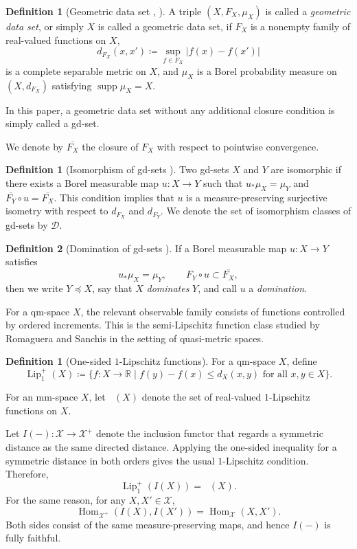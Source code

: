 \documentclass{amsart}
\theoremstyle{plain}
\theoremstyle{definition}
\newtheorem{definition}[theorem]{Definition}
\newtheorem*{definition*}{Definition}
\theoremstyle{remark}
\newcommand{\R}{\mathbb{R}}
\newcommand{\D}{\mathcal{D}}
\newcommand{\X}{\mathcal{X}}
\newcommand{\Xp}{\mathcal{X}^{+}}
\newcommand{\lipplus}{\operatorname{Lip}^{+}_{1}}
\DeclareMathOperator{\lipone}{Lip_1}
\DeclareMathOperator{\supp}{supp}
\begin{document}
\begin{definition}[Geometric data set {\cite[Definition~3.1]{gds1}, \cite{gds2}}]
\label{def:gds}
A triple $(X,F_X,\mu_X)$ is called a \emph{geometric data set}, or simply $X$ is called a geometric data set, if $F_X$ is a nonempty family of real-valued functions on $X$,
\[d_{F_X}(x,x')\coloneqq\sup_{f\in F_X}|f(x)-f(x')|\]
is a complete separable metric on $X$, and $\mu_X$ is a Borel probability measure on $(X,d_{F_X})$ satisfying $\supp\mu_X=X$.
\end{definition}
In this paper, a geometric data set without any additional closure condition is simply called a gd-set.

We denote by $\overline{F_X}$ the closure of $F_X$ with respect to pointwise convergence.
\begin{definition*}[Isomorphism of gd-sets {\cite[Lemma~2.2, Definitions~3.1 and~3.3, and Proposition~3.10]{gds1}}]
Two gd-sets $X$ and $Y$ are isomorphic if there exists a Borel measurable map $u\colon X\to Y$ such that $u_*\mu_X=\mu_Y$ and $\overline{F_Y}\circ u=\overline{F_X}$. This condition implies that $u$ is a measure-preserving surjective isometry with respect to $d_{F_X}$ and $d_{F_Y}$. We denote the set of isomorphism classes of gd-sets by $\D$.
\end{definition*}

\begin{definition*}[Domination of gd-sets {\cite[Definition~3.8]{gds1}}]
If a Borel measurable map $u\colon X\to Y$ satisfies
\[u_*\mu_X=\mu_Y,\qquad F_Y\circ u\subset\overline{F_X},\]
then we write $Y\preceq X$, say that $X$ \emph{dominates} $Y$, and call $u$ a \emph{domination}.
\end{definition*}

For a qm-space $X$, the relevant observable family consists of functions controlled by ordered increments. This is the semi-Lipschitz function class studied by Romaguera and Sanchis \cite{romaguera2000semi} in the setting of quasi-metric spaces.

\begin{definition}[One-sided $1$-Lipschitz functions]
\label{def:lipplus}
For a qm-space $X$, define
\[\lipplus(X)\coloneqq\{f\colon X\to\R\mid f(y)-f(x)\leq d_X(x,y)\text{ for all $x,y\in X$}\}.\]
\end{definition}

For an mm-space $X$, let $\lipone(X)$ denote the set of real-valued $1$-Lipschitz functions on $X$.

Let $I(-)\colon\X\to\Xp$ denote the inclusion functor that regards a symmetric distance as the same directed distance. Applying the one-sided inequality for a symmetric distance in both orders gives the usual $1$-Lipschitz condition. Therefore,
\begin{equation}
\label{eq:symmetric-directed-lipschitz}
\lipplus(I(X))=\lipone(X).
\end{equation}
For the same reason, for any $X,X'\in\X$,
\begin{equation}
\label{eq:i-fully-faithful}
\operatorname{Hom}_{\Xp}(I(X),I(X'))=\operatorname{Hom}_{\X}(X,X').
\end{equation}
Both sides consist of the same measure-preserving maps, and hence $I(-)$ is fully faithful.
\end{document}

